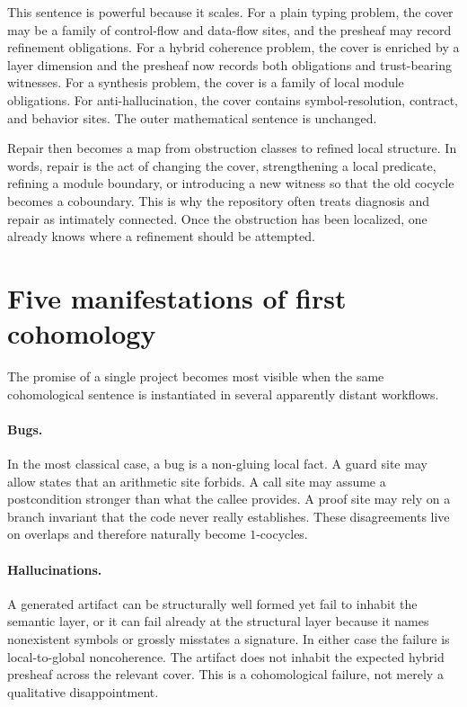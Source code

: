 This sentence is powerful because it scales. For a plain typing problem, the cover may be a
family of control-flow and data-flow sites, and the presheaf may record refinement
obligations. For a hybrid coherence problem, the cover is enriched by a layer dimension and
the presheaf now records both obligations and trust-bearing witnesses. For a synthesis
problem, the cover is a family of local module obligations. For anti-hallucination, the cover
contains symbol-resolution, contract, and behavior sites. The outer mathematical sentence is
unchanged.

Repair then becomes a map from obstruction classes to refined local structure. In words,
repair is the act of changing the cover, strengthening a local predicate, refining a module
boundary, or introducing a new witness so that the old cocycle becomes a coboundary. This is
why the repository often treats diagnosis and repair as intimately connected. Once the
obstruction has been localized, one already knows where a refinement should be attempted.

\section*{Five manifestations of first cohomology}
The promise of a single project becomes most visible when the same cohomological sentence is
instantiated in several apparently distant workflows.

\paragraph{Bugs.}
In the most classical case, a bug is a non-gluing local fact. A guard site may allow states
that an arithmetic site forbids. A call site may assume a postcondition stronger than what
the callee provides. A proof site may rely on a branch invariant that the code never really
establishes. These disagreements live on overlaps and therefore naturally become $1$-cocycles.

\paragraph{Hallucinations.}
A generated artifact can be structurally well formed yet fail to inhabit the semantic layer,
or it can fail already at the structural layer because it names nonexistent symbols or
grossly misstates a signature. In either case the failure is local-to-global noncoherence.
The artifact does not inhabit the expected hybrid presheaf across the relevant cover. This is
a cohomological failure, not merely a qualitative disappointment.


